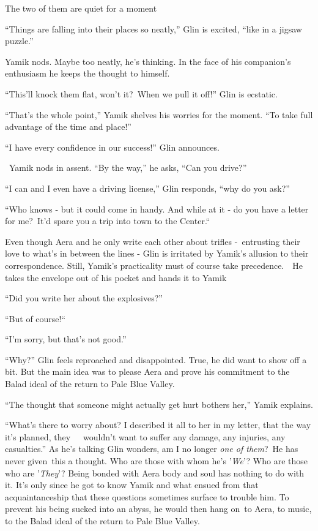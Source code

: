 \documentclass[twoside,11pt]{book}
\begin{document}
The two of them are quiet for a moment

``Things are falling into their places so neatly,'' Glin is excited, ``like in a
jigsaw puzzle.''

Yamik nods. Maybe too neatly, he's thinking. In the face of his companion's enthusiasm he keeps the thought to himself.

{}``This'll knock them flat, won't it?\ When we pull it off!'' Glin is ecstatic.\ 

``That's the whole point,'' Yamik shelves his worries for the moment. ``To take
full advantage of the time and place!''

``I have every confidence in our success!'' Glin announces.

~Yamik nods in assent. ``By the way,'' he asks, ``Can you drive?''

``I can and I even have a driving license,'' Glin responds, ``why do you
ask?''

``Who knows - but it could come in handy. And while at it - do you have a letter for me?\ It'd spare you a
trip into town to the Center.``\ 

Even though Aera and he only write each other about trifles -\ entrusting their love to what's in between the lines -
Glin is irritated by Yamik's allusion to their correspondence. Still, Yamik's practicality must of course take
precedence.\ \ He takes the envelope out of his pocket and hands it to Yamik ~ 

``Did you write her about the explosives?'' 

``But of course!``~ 

``I'm sorry, but that's not good.'' 

``Why?'' Glin feels reproached and disappointed. True, he did want to show off a bit. But the
main idea was to please Aera and prove his commitment to the Balad ideal of the return to Pale Blue Valley. 

``The thought that someone might actually get hurt bothers her,'' Yamik explains.

``What's there to worry about? I described it all to her in my letter, that the way it's planned,
they\ \ \ wouldn't want to suffer any damage, any injuries, any casualties.'' As he's talking Glin
wonders, am I no longer \textit{one of them}?{\ }He has never given~this a
thought. Who are those with whom he's '\textit{We}{}'? Who are those who are '\textit{They}{}'? Being bonded with Aera
body and soul has nothing to do with it. It's only since he got to know Yamik and what ensued from that
acquaintanceship that these questions sometimes surface to trouble him. To prevent his being sucked into an abyss, he
would then hang on\ to Aera, to music, to the Balad ideal of the return to Pale Blue Valley. 
\end{document}
